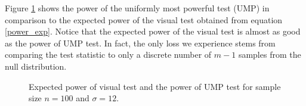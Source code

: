 \documentclass{article}
\newtheorem{thm}{Theorem}[section]
\begin{document}
Figure \ref{fig:power_expected} shows the power of the uniformly most powerful test (UMP) in comparison to the expected power of the visual test obtained from equation \eqref{power_exp}. Notice that the expected power of the visual test is almost as good as the power of UMP test. In fact, the only loss we experience stems from comparing the test statistic to only a discrete number of  $m-1$ samples from the null distribution. 

% 
%
%
%
%
%
\begin{figure}[hbtp]
   \centering
       \caption{Expected power of visual test  and the power of UMP test for sample size $n =100$ and $\sigma = 12$.}
       \label{fig:power_expected}
\end{figure}
\end{document}
